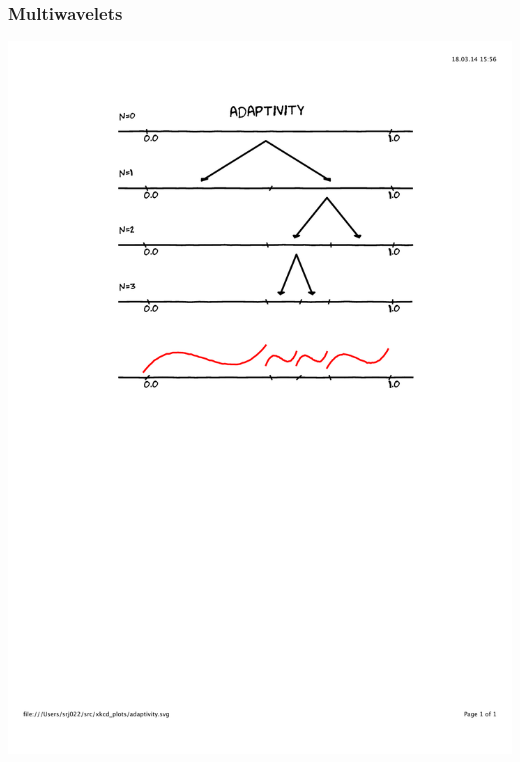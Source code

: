 \begin{frame}
    \frametitle{Multiwavelets}
    \centering
    \includegraphics[scale=0.5, clip, viewport=100 400 500 800]{figures/adaptivity.pdf}
\end{frame}

